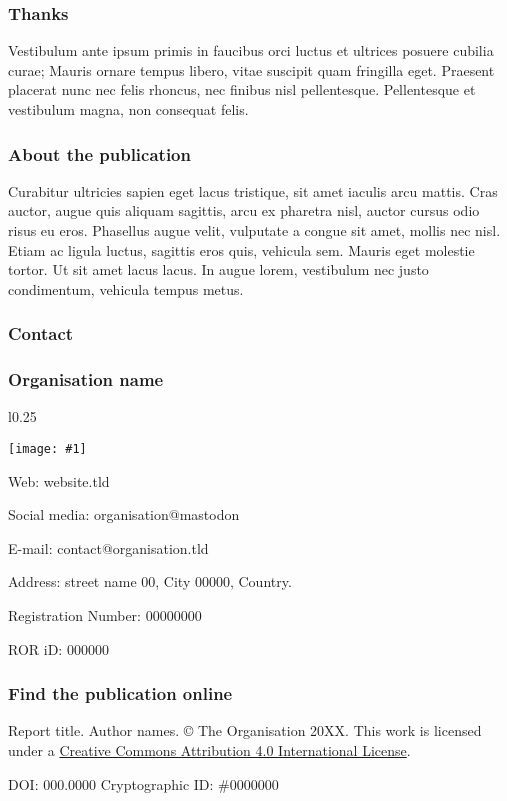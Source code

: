 \documentclass{article}
\newlength{\imgwidth}
\newcommand\scaledgraphics[2]{%
                
\settowidth{\imgwidth}{\texttt{[image: \#1]}}%
                
\setlength{\imgwidth}{\minof{\imgwidth}{#2\textwidth}}%
                
\texttt{[image: \#1]}%
                
}
\begin{document}
\subsubsection{Thanks}\label{H1663104}



Vestibulum ante ipsum primis in faucibus orci luctus et ultrices posuere cubilia curae; Mauris ornare tempus libero, vitae suscipit quam fringilla eget. Praesent placerat nunc nec felis rhoncus, nec finibus nisl pellentesque. Pellentesque et vestibulum magna, non consequat felis.


\subsubsection{About the publication}\label{H6025747}



Curabitur ultricies sapien eget lacus tristique, sit amet iaculis arcu mattis. Cras auctor, augue quis aliquam sagittis, arcu ex pharetra nisl, auctor cursus odio risus eu eros. Phasellus augue velit, vulputate a congue sit amet, mollis nec nisl. Etiam ac ligula luctus, sagittis eros quis, vehicula sem. Mauris eget molestie tortor. Ut sit amet lacus lacus. In augue lorem, vestibulum nec justo condimentum, vehicula tempus metus.


\subsubsection{Contact }\label{H5417875}



\subsubsection{Organisation name}\label{H4140235}


\begin{wrapfigure}{l}{0.25\textwidth}
\scaledgraphics{6d296396-e69c-4f38-bc21-f5bdb55818f8.png}{0.25}
\label{F76335231}
\end{wrapfigure}











Web: website.tld


Social media: organisation@mastodon


E-mail: contact@organisation.tld


Address: street name 00, City 00000, Country.


Registration Number: 00000000


ROR iD: 000000


\subsubsection{Find the publication online}\label{H5096991}



Report title. Author names. © The Organisation 20XX. This work is licensed under a \href{https://creativecommons.org/licenses/by/4.0/}{Creative Commons Attribution 4.0 International License}.


DOI: 000.0000 Cryptographic ID: \#0000000
\end{document}
